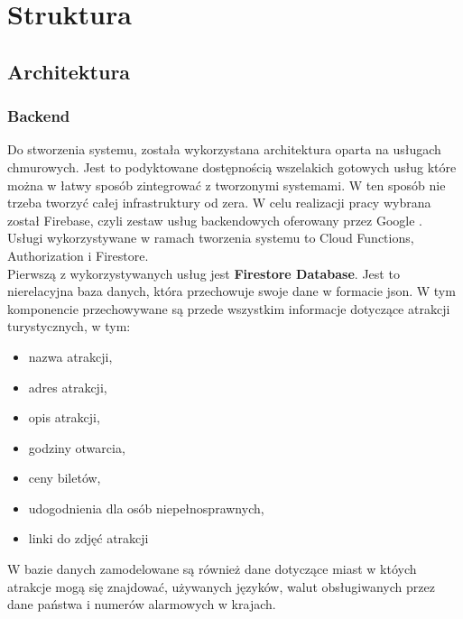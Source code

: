 \newpage
\section{Struktura}
    \subsection{Architektura}
    \subsubsection{Backend}
    Do stworzenia systemu, została wykorzystana architektura oparta na usługach chmurowych. Jest to podyktowane dostępnością wszelakich gotowych usług które można w łatwy sposób zintegrować z tworzonymi systemami. W ten sposób nie trzeba tworzyć całej infrastruktury od zera. W celu realizacji pracy wybrana został Firebase, czyli zestaw usług backendowych oferowany przez Google \cite{Firebase}. \\
    Usługi wykorzystywane w ramach tworzenia systemu to Cloud Functions, Authorization i Firestore. \\
    Pierwszą z wykorzystywanych usług jest \textbf{Firestore Database}. Jest to nierelacyjna baza danych, która przechowuje swoje dane w formacie json. W tym komponencie przechowywane są przede wszystkim informacje dotyczące atrakcji turystycznych, w tym:
    \begin{itemize}
        \item nazwa atrakcji,
        \item adres atrakcji,
        \item opis atrakcji,
        \item godziny otwarcia,
        \item ceny biletów,
        \item udogodnienia dla osób niepełnosprawnych,
        \item linki do zdjęć atrakcji
    \end{itemize}
    W bazie danych zamodelowane są również dane dotyczące miast w któych atrakcje mogą się znajdować, używanych języków, walut obsługiwanych przez dane państwa i numerów alarmowych w krajach.

